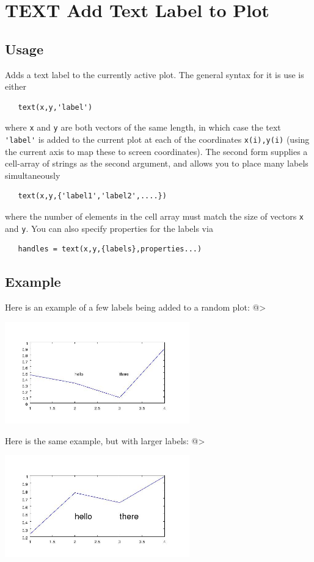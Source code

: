 \section{TEXT Add Text Label to Plot}

\subsection{Usage}

Adds a text label to the currently active plot.  The general
syntax for it is use is either
\begin{verbatim}
   text(x,y,'label')
\end{verbatim}
where \verb|x| and \verb|y| are both vectors of the same length, in which
case the text \verb|'label'| is added to the current plot at each of the
coordinates \verb|x(i),y(i)| (using the current axis to map these to screen
coordinates).  The second form supplies a cell-array of strings
as the second argument, and allows you to place many labels simultaneously
\begin{verbatim}
   text(x,y,{'label1','label2',....})
\end{verbatim}
where the number of elements in the cell array must match the size of
vectors \verb|x| and \verb|y|.  You can also specify properties for the labels
via
\begin{verbatim}
   handles = text(x,y,{labels},properties...)
\end{verbatim}
\subsection{Example}

Here is an example of a few labels being added to a random plot:
@>


\centerline{\includegraphics[width=8cm]{text1}}

Here is the same example, but with larger labels:
@>


\centerline{\includegraphics[width=8cm]{text2}}

